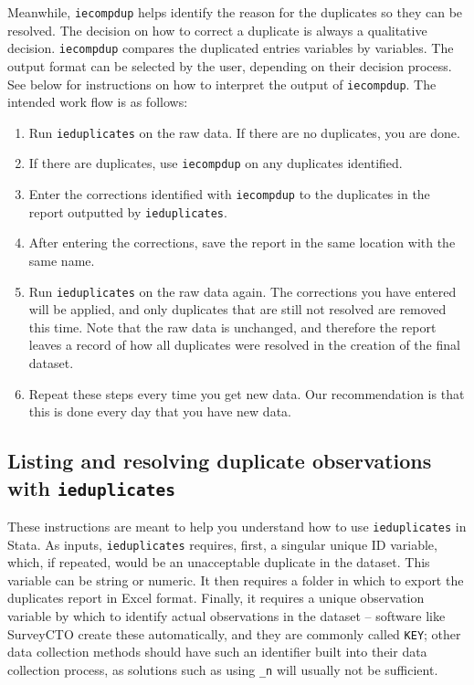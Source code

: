 \documentclass{tufte-handout}
\begin{document}
Meanwhile, \texttt{iecompdup} helps identify the reason for the duplicates so they can be resolved.
The decision on how to correct a duplicate is always a qualitative decision.
\texttt{iecompdup} compares the duplicated entries variables by variables. 
The output format can be selected by the user, depending on their decision process.
See below for instructions on how to interpret the output of \texttt{iecompdup}.
The intended work flow is as follows:

\begin{enumerate}
    \item Run \texttt{ieduplicates} on the raw data. If there are no duplicates, you are done.
    \item If there are duplicates, use \texttt{iecompdup} on any duplicates identified.
    \item Enter the corrections identified with \texttt{iecompdup} to the duplicates in the report outputted by \texttt{ieduplicates}.
    \item After entering the corrections, save the report in the same location with the same name.
    \item Run \texttt{ieduplicates} on the raw data again. The corrections you have entered will be applied, and only duplicates that are still not resolved are removed this time. Note that the raw data is unchanged, and therefore the report leaves a record of how all duplicates were resolved in the creation of the final dataset.
    \item Repeat these steps every time you get new data. Our recommendation is that this is done every day that you have new data.
\end{enumerate}

\subsection{Listing and resolving duplicate observations with \texttt{ieduplicates}}

These instructions are meant to help you understand how to use \texttt{ieduplicates} in Stata.
As inputs, \texttt{ieduplicates} requires, first, a singular unique ID variable,
which, if repeated, would be an unacceptable duplicate in the dataset.
This variable can be string or numeric.
It then requires a folder in which to export the duplicates report in Excel format.
Finally, it requires a unique observation variable by which to identify actual observations in the dataset --
software like SurveyCTO create these automatically, and they are commonly called \texttt{KEY};
other data collection methods should have such an identifier built into their data collection process,
as solutions such as using \texttt{\_n} will usually not be sufficient.
\end{document}
